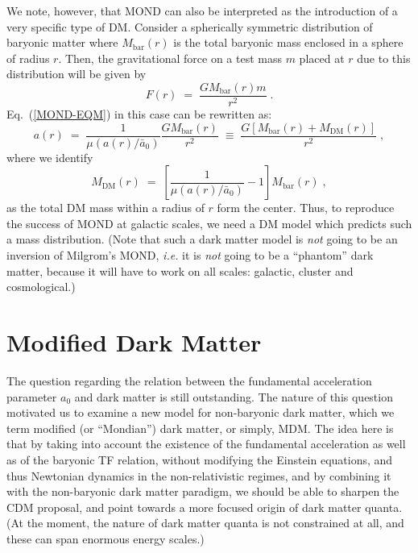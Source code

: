 \documentclass{bjp}
\newcommand{\GN}{G}
\newcommand{\ac}{\bar{a}_0}
\begin{document}


We note, however, that MOND can also be interpreted as the introduction of a very specific type of DM.
Consider a spherically symmetric distribution of baryonic matter where
$M_\mathrm{bar}(r)$ is the total baryonic mass enclosed in a sphere of radius $r$.
Then, the gravitational force on a test mass $m$ placed at $r$ due to this distribution will be given by
%
\begin{equation}
F(r) \;=\; \dfrac{\GN M_\mathrm{bar}(r)m}{r^2}\;.
\end{equation}
%
Eq.~(\ref{MOND-EQM}) in this case can be rewritten as:
%
\begin{equation}
a(r)
\;=\;
\dfrac{1}{\mu(a(r)/\ac)}\dfrac{\GN M_\mathrm{bar}(r)}{r^2}
\;\equiv\;
\dfrac{\GN[M_\mathrm{bar}(r)+M_\mathrm{DM}(r)]}{r^2}
\;,
\end{equation}
%
where we identify
%
\begin{equation}
M_\mathrm{DM}(r) \;=\; \left[\dfrac{1}{\mu(a(r)/\ac)}-1\right]M_\mathrm{bar}(r)\;,
\end{equation}
%
as the total DM mass within a radius of $r$ form the center.
Thus, to reproduce the success of MOND at galactic scales, we need a DM model which 
predicts such a mass distribution. (Note that such a dark matter model is {\it not} going to be an
inversion of Milgrom's MOND, {\it i.e.} it is {\it not} going to be a  ``phantom'' dark matter, because it will
have to work on all scales: galactic, cluster and cosmological.)



\section{Modified Dark Matter}

The question regarding the relation between the fundamental acceleration parameter $a_0$ and dark matter is still outstanding. The nature of this question motivated us to examine a new model for non-baryonic dark matter, which we term modified (or ``Mondian'') dark matter, or simply, MDM. 
The idea here is that by taking into account the existence of the fundamental acceleration as well as of the baryonic TF relation, without modifying the Einstein equations, and thus Newtonian dynamics in the non-relativistic regimes, and by combining it with the non-baryonic dark matter paradigm, we should be able to sharpen the CDM proposal, and point towards a more focused origin of dark matter quanta. (At the moment, the nature of dark matter quanta is not constrained at all, and these can span enormous energy scales.)
\end{document}
